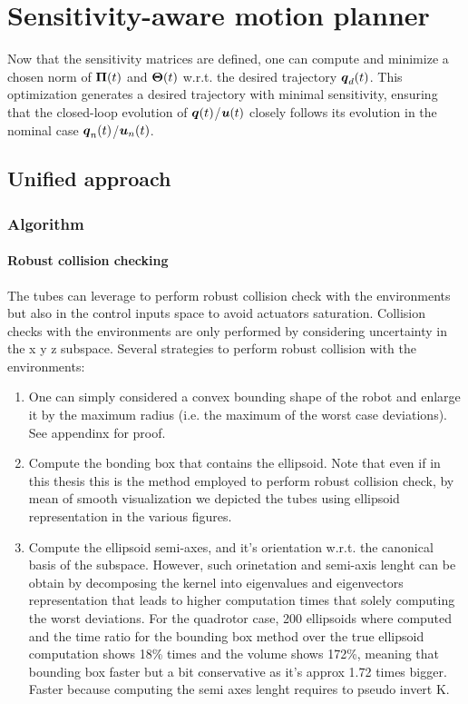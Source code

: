 \chapter{Sensitivity-aware motion planner}

Now that the sensitivity matrices are defined, one can compute and minimize a chosen norm of $\boldsymbol{\Pi}(t)$ and $\boldsymbol{\Theta}(t)$ w.r.t. the desired trajectory $\boldsymbol{q}_d(t)$. 
This optimization generates a desired trajectory with minimal sensitivity, ensuring that the closed-loop evolution of $\boldsymbol{q}(t)$/$\boldsymbol{u}(t)$ closely follows its evolution in the nominal case $\boldsymbol{q}_n(t)$/$\boldsymbol{u}_n(t)$.

\section{Unified approach}
\subsection{Algorithm}
\subsubsection{Robust collision checking}
The tubes can leverage to perform robust collision check with the environments but also in the control inputs space to avoid actuators saturation. 
Collision checks with the environments are only performed by considering uncertainty in the x y z subspace.
Several strategies to perform robust collision with the environments:
\begin{enumerate}
    \item One can simply considered a convex bounding shape of the robot and enlarge it by the maximum radius (i.e. the maximum of the worst case deviations). See appendinx for proof.
    \item Compute the bonding box that contains the ellipsoid. Note that even if in this thesis this is the method employed to perform robust collision check, by mean of smooth visualization we depicted the tubes using ellipsoid representation in the various figures.
    \item Compute the ellipsoid semi-axes, and it's orientation w.r.t. the canonical basis of the subspace. However, such orinetation and semi-axis lenght can be obtain by decomposing the kernel into eigenvalues and eigenvectors representation that leads to higher computation times that solely computing the worst deviations. For the quadrotor case, 200 ellipsoids where computed and the time ratio for the bounding box method over the true ellipsoid computation shows 18\% times and the volume shows 172\%, meaning that bounding box faster but a bit conservative as it's approx 1.72 times bigger. Faster because computing the semi axes lenght requires to pseudo invert K.
\end{enumerate}
